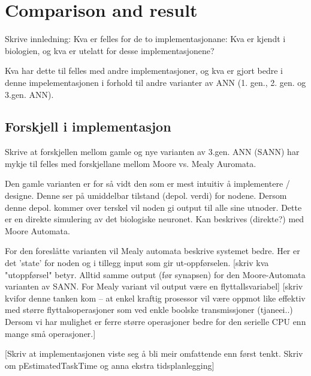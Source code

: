 %



\chapter{Comparison and result} 




Skrive innledning: Kva er felles for de to implementasjonane: Kva er kjendt i biologien, og kva er utelatt for desse implementasjonene?

Kva har dette til felles med andre implementasjoner, og kva er gjort bedre i denne impelementasjonen i forhold til andre varianter av ANN (1. gen., 2. gen. og 3.gen. ANN).

\section{Forskjell i implementasjon}
Skrive at forskjellen mellom gamle og nye varianten av 3.gen. ANN (SANN) har mykje til felles med forskjellane mellom Moore vs. Mealy Auromata.

Den gamle varianten er for så vidt den som er mest intuitiv å implementere / designe. Denne ser på umiddelbar tilstand (depol. verdi) for nodene. Dersom denne depol. kommer over terskel vil noden gi output til alle sine utnoder.
Dette er en direkte simulering av det biologiske neuronet. Kan beskrives (direkte?) med Moore Automata.

For den foreslåtte varianten vil Mealy automata beskrive systemet bedre. Her er det 'state' for noden og i tillegg input som gir ut-oppførselen.
[skriv kva "utoppførsel" betyr. Alltid samme output (før synapsen) for den Moore-Automata varianten av SANN. For Mealy variant vil output være en flyttallsvariabel]
[skriv kvifor denne tanken kom -- at enkel kraftig prosessor vil være oppmot like effektiv med større flyttalsoperasjoner som ved enkle boolske transmissjoner (tjaneei..)
Dersom vi har mulighet er ferre større operasjoner bedre for den serielle CPU enn mange små operasjoner.]

[Skriv at implementasjonen viste seg å bli meir omfattende enn først tenkt. Skriv om pEstimatedTaskTime og anna ekstra tidsplanlegging]




